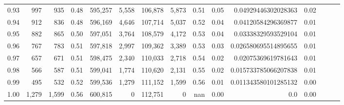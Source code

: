 \begin{tabular}{rrrrrrrrrrrrrrr}
0.93 &     997 &    935 &  0.48 &  595,257 &    5,558 &  106,878 &    5,873 &  0.51 &  0.05 &   0.04929446302028363 &      0.02 \\
0.94 &     912 &    836 &  0.48 &  596,169 &    4,646 &  107,714 &    5,037 &  0.52 &  0.04 &   0.04120584296369877 &      0.01 \\
0.95 &     882 &    865 &  0.50 &  597,051 &    3,764 &  108,579 &    4,172 &  0.53 &  0.04 &   0.03338329593529104 &      0.01 \\
0.96 &     767 &    783 &  0.51 &  597,818 &    2,997 &  109,362 &    3,389 &  0.53 &  0.03 &  0.026580695514895655 &      0.01 \\
0.97 &     657 &    671 &  0.51 &  598,475 &    2,340 &  110,033 &    2,718 &  0.54 &  0.02 &   0.02075369619781643 &      0.01 \\
0.98 &     566 &    587 &  0.51 &  599,041 &    1,774 &  110,620 &    2,131 &  0.55 &  0.02 &  0.015733785066207838 &      0.01 \\
0.99 &     495 &    532 &  0.52 &  599,536 &    1,279 &  111,152 &    1,599 &  0.56 &  0.01 &  0.011343580101285132 &      0.00 \\
1.00 &   1,279 &  1,599 &  0.56 &  600,815 &        0 &  112,751 &        0 &   nan &  0.00 &                   0.0 &      0.00 \\
\bottomrule
\end{tabular}
